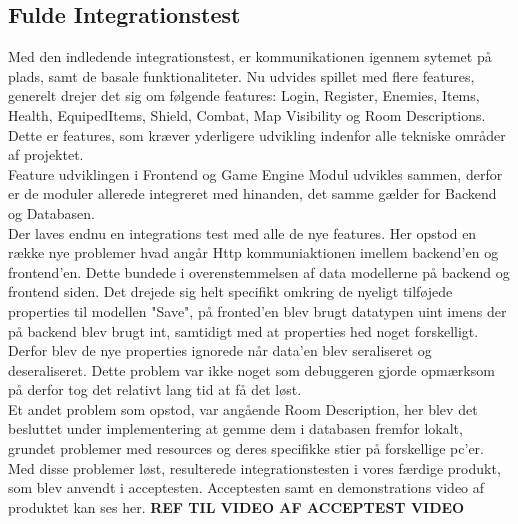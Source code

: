 
\subsection{Fulde Integrationstest}

Med den indledende integrationstest, er kommunikationen igennem sytemet på plads, samt de basale funktionaliteter. Nu udvides spillet med flere features, generelt drejer det sig om følgende features: Login, Register, Enemies, Items, Health, EquipedItems, Shield, Combat, Map Visibility og Room Descriptions. Dette er features, som kræver yderligere udvikling indenfor alle tekniske områder af projektet.\\


Feature udviklingen i Frontend og Game Engine Modul udvikles sammen, derfor er de moduler allerede integreret med hinanden, det samme gælder for Backend og Databasen.\\

Der laves endnu en integrations test med alle de nye features. Her opstod en række nye problemer hvad angår Http kommuniaktionen imellem backend'en og frontend'en. Dette bundede i overenstemmelsen af data modellerne på backend og frontend siden. Det drejede sig helt specifikt omkring de nyeligt tilføjede properties til modellen "Save", på fronted'en blev brugt datatypen uint imens der på backend blev brugt int, samtidigt med at properties hed noget forskelligt. Derfor blev de nye properties ignorede når data'en blev seraliseret og deseraliseret. Dette problem var ikke noget som debuggeren gjorde opmærksom på derfor tog det relativt lang tid at få det løst.\\

Et andet problem som opstod, var angående Room Description, her blev det besluttet under implementering at gemme dem i databasen fremfor lokalt, grundet problemer med resources og deres specifikke stier på forskellige pc'er.\\

Med disse problemer løst, resulterede integrationstesten i vores færdige produkt, som blev anvendt i acceptesten. Acceptesten samt en demonstrations video af produktet kan ses her. \textbf{REF TIL VIDEO AF ACCEPTEST VIDEO}\\    
 

  

